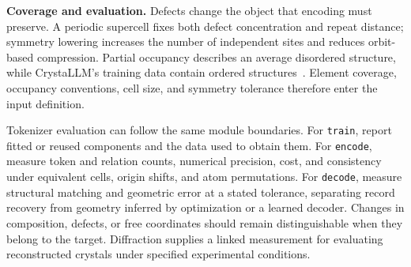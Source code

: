 \textbf{Coverage and evaluation.}
Defects change the object that encoding must preserve. A periodic supercell fixes both defect concentration and repeat distance; symmetry lowering increases the number of independent sites and reduces orbit-based compression. Partial occupancy describes an average disordered structure, while CrystaLLM's training data contain ordered structures~\citep{antunes2024crystallm}. Element coverage, occupancy conventions, cell size, and symmetry tolerance therefore enter the input definition.

Tokenizer evaluation can follow the same module boundaries. For \texttt{train}, report fitted or reused components and the data used to obtain them. For \texttt{encode}, measure token and relation counts, numerical precision, cost, and consistency under equivalent cells, origin shifts, and atom permutations. For \texttt{decode}, measure structural matching and geometric error at a stated tolerance, separating record recovery from geometry inferred by optimization or a learned decoder. Changes in composition, defects, or free coordinates should remain distinguishable when they belong to the target. Diffraction supplies a linked measurement for evaluating reconstructed crystals under specified experimental conditions.

